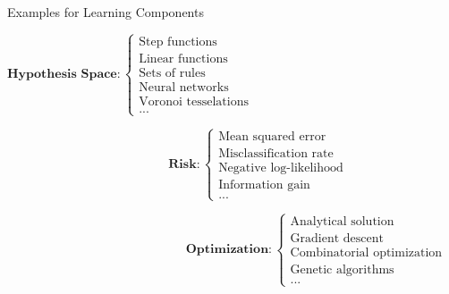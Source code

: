 \documentclass[11pt,compress,t,notes=noshow, xcolor=table]{beamer}
\begin{document}

\begin{frame}[squeeze]{Examples for Learning Components}


\begin{footnotesize}

$\textbf{Hypothesis Space}: \begin{cases} 

\text{Step functions} \\
\text{Linear functions}\\
\text{Sets of rules}\\
\text{Neural networks}\\
\text{Voronoi tesselations}\\
\text{...}
\end{cases}$

$\phantom{Hypothesis Space RISK RISK} \textbf{Risk}: \begin{cases}
\text{Mean squared error}\\
\text{Misclassification rate}\\
\text{Negative log-likelihood}\\
\text{Information gain}\\
\text{...}
\end{cases}$

$\phantom{hypothesis space risk RISK RISK} \textbf{Optimization}: \begin{cases}
\text{Analytical solution}\\
\text{Gradient descent}\\
\text{Combinatorial optimization}\\
\text{Genetic algorithms}\\
\text{...}
\end{cases}$

\end{footnotesize}
\end{frame}


\endlecture
\end{document}

